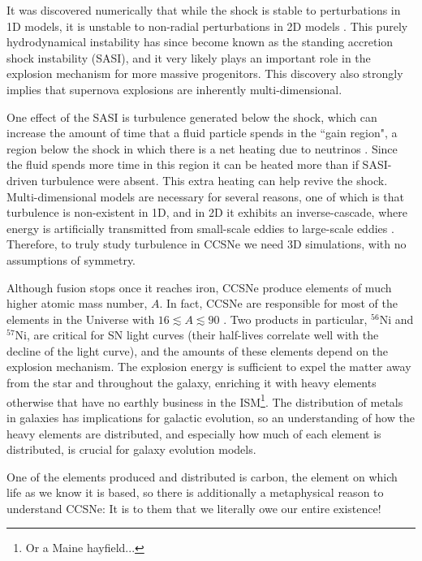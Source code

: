 
It was discovered numerically that while the shock is stable to
perturbations in 1D models, it is unstable to non-radial perturbations
in 2D models \citep{bmd2003}.
This purely hydrodynamical instability has since become known as the
standing accretion shock instability (SASI), and it very likely plays an
important role in the explosion mechanism for more massive progenitors.
This discovery also strongly implies that supernova explosions are
inherently multi-dimensional.

One effect of the SASI is turbulence generated below the shock,
which can increase the amount of time that a fluid particle spends
in the ``gain region", a region below the shock in which there is a
net heating due to neutrinos \citep{co2015}.
Since the fluid spends more time in this region it can be heated more than if
SASI-driven turbulence were absent.
This extra heating can help revive the shock.
Multi-dimensional models are necessary for several reasons,
one of which is that turbulence is non-existent in 1D, and in 2D it
exhibits an inverse-cascade, where energy is artificially transmitted
from small-scale eddies to large-scale eddies \citep{yem2017}.
Therefore, to truly study turbulence in CCSNe we need 3D simulations,
with no assumptions of symmetry.

Although fusion stops once it reaches iron, CCSNe produce elements of much
higher atomic mass number, $A$.
In fact, CCSNe are responsible for most of the elements in the Universe with
$16\lesssim A\lesssim90$ \citep{bw2017}.
Two products in particular, $^{56}$Ni and $^{57}$Ni, are critical for SN light
curves (their half-lives correlate well with the decline of the light curve),
and the amounts of these elements depend on the explosion mechanism.
The explosion energy is sufficient to expel the matter away from the star
and throughout the galaxy, enriching it with heavy elements otherwise that have
no earthly business in the ISM\footnote{Or a Maine hayfield...}.
The distribution of metals in galaxies has implications for galactic
evolution, so an understanding of how the heavy elements are distributed,
and especially how much of each element is distributed,
is crucial for galaxy evolution models.

One of the elements produced and distributed is carbon,
the element on which life as we know it is based, so there is additionally
a metaphysical reason to understand CCSNe:
It is to them that we literally owe our entire existence!

